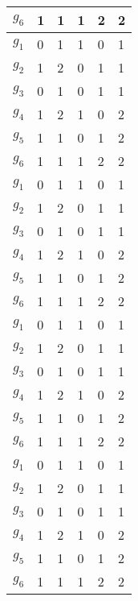 \begin{longtable}[c]{|l|l|l|l|l|l|}
	$g_6$&1&1&1&2&2\\ \hline
%		
	$g_1$&0&1&1&0&1\\ \hline 
	$g_2$&1&2&0&1&1\\ \hline
	$g_3$&0&1&0&1&1\\ \hline
	$g_4$&1&2&1&0&2\\ \hline
	$g_5$&1&1&0&1&2\\ \hline
	$g_6$&1&1&1&2&2\\ \hline
%
	$g_1$&0&1&1&0&1\\ \hline 
	$g_2$&1&2&0&1&1\\ \hline
	$g_3$&0&1&0&1&1\\ \hline
	$g_4$&1&2&1&0&2\\ \hline
	$g_5$&1&1&0&1&2\\ \hline
	$g_6$&1&1&1&2&2\\ \hline
%
	$g_1$&0&1&1&0&1\\ \hline 
	$g_2$&1&2&0&1&1\\ \hline
	$g_3$&0&1&0&1&1\\ \hline
	$g_4$&1&2&1&0&2\\ \hline
	$g_5$&1&1&0&1&2\\ \hline
	$g_6$&1&1&1&2&2\\ \hline
%
	$g_1$&0&1&1&0&1\\ \hline 
	$g_2$&1&2&0&1&1\\ \hline
	$g_3$&0&1&0&1&1\\ \hline
	$g_4$&1&2&1&0&2\\ \hline
	$g_5$&1&1&0&1&2\\ \hline
	$g_6$&1&1&1&2&2\\ \hline
\end{longtable}
\normalsize%
\endgroup